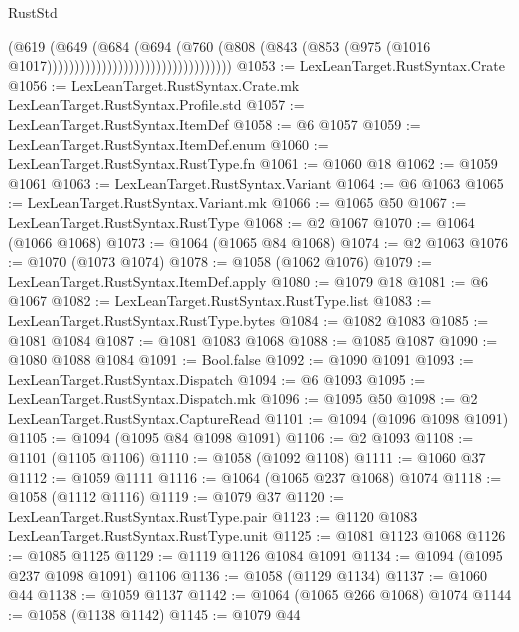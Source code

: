 \begin{lexlean}{RustStd}
\begin{coremodule}
                                                    (@619
                                                      (@649
                                                        (@684
                                                          (@694
                                                            (@760
                                                              (@808
                                                                (@843
                                                                  (@853
                                                                    (@975
                                                                      (@1016
                                                                        @1017))))))))))))))))))))))))))))))))))
@1053 := LexLeanTarget.RustSyntax.Crate
@1056 := LexLeanTarget.RustSyntax.Crate.mk LexLeanTarget.RustSyntax.Profile.std
@1057 := LexLeanTarget.RustSyntax.ItemDef
@1058 := @6 @1057
@1059 := LexLeanTarget.RustSyntax.ItemDef.enum
@1060 := LexLeanTarget.RustSyntax.RustType.fn
@1061 := @1060 @18
@1062 := @1059 @1061
@1063 := LexLeanTarget.RustSyntax.Variant
@1064 := @6 @1063
@1065 := LexLeanTarget.RustSyntax.Variant.mk
@1066 := @1065 @50
@1067 := LexLeanTarget.RustSyntax.RustType
@1068 := @2 @1067
@1070 := @1064 (@1066 @1068)
@1073 := @1064 (@1065 @84 @1068)
@1074 := @2 @1063
@1076 := @1070 (@1073 @1074)
@1078 := @1058 (@1062 @1076)
@1079 := LexLeanTarget.RustSyntax.ItemDef.apply
@1080 := @1079 @18
@1081 := @6 @1067
@1082 := LexLeanTarget.RustSyntax.RustType.list
@1083 := LexLeanTarget.RustSyntax.RustType.bytes
@1084 := @1082 @1083
@1085 := @1081 @1084
@1087 := @1081 @1083 @1068
@1088 := @1085 @1087
@1090 := @1080 @1088 @1084
@1091 := Bool.false
@1092 := @1090 @1091
@1093 := LexLeanTarget.RustSyntax.Dispatch
@1094 := @6 @1093
@1095 := LexLeanTarget.RustSyntax.Dispatch.mk
@1096 := @1095 @50
@1098 := @2 LexLeanTarget.RustSyntax.CaptureRead
@1101 := @1094 (@1096 @1098 @1091)
@1105 := @1094 (@1095 @84 @1098 @1091)
@1106 := @2 @1093
@1108 := @1101 (@1105 @1106)
@1110 := @1058 (@1092 @1108)
@1111 := @1060 @37
@1112 := @1059 @1111
@1116 := @1064 (@1065 @237 @1068) @1074
@1118 := @1058 (@1112 @1116)
@1119 := @1079 @37
@1120 := LexLeanTarget.RustSyntax.RustType.pair
@1123 := @1120 @1083 LexLeanTarget.RustSyntax.RustType.unit
@1125 := @1081 @1123 @1068
@1126 := @1085 @1125
@1129 := @1119 @1126 @1084 @1091
@1134 := @1094 (@1095 @237 @1098 @1091) @1106
@1136 := @1058 (@1129 @1134)
@1137 := @1060 @44
@1138 := @1059 @1137
@1142 := @1064 (@1065 @266 @1068) @1074
@1144 := @1058 (@1138 @1142)
@1145 := @1079 @44

\end{coremodule}
\end{lexlean}
